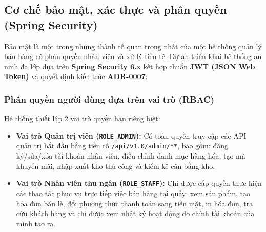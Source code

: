 \subsection{Cơ chế bảo mật, xác thực và phân quyền (Spring Security)}
Bảo mật là một trong những thành tố quan trọng nhất của một hệ thống quản lý bán hàng có phân quyền nhân viên và xử lý tiền tệ. Dự án triển khai hệ thống an ninh đa lớp dựa trên \textbf{Spring Security 6.x} kết hợp chuẩn \textbf{JWT (JSON Web Token)} \cite{rfc7519} và quyết định kiến trúc \textbf{ADR-0007}:

\subsubsection{Phân quyền người dùng dựa trên vai trò (RBAC)}
Hệ thống thiết lập 2 vai trò quyền hạn riêng biệt:
\begin{itemize}[leftmargin=1.5cm]
    \item \textbf{Vai trò Quản trị viên (\texttt{ROLE\_ADMIN}):} Có toàn quyền truy cập các API quản trị bắt đầu bằng tiền tố \texttt{/api/v1.0/admin/**}, bao gồm: đăng ký/sửa/xóa tài khoản nhân viên, điều chỉnh danh mục hàng hóa, tạo mã khuyến mãi, nhập xuất kho thủ công và kiểm kê cân bằng kho.
    \item \textbf{Vai trò Nhân viên thu ngân (\texttt{ROLE\_STAFF}):} Chỉ được cấp quyền thực hiện các thao tác phục vụ trực tiếp việc bán hàng tại quầy: xem sản phẩm, tạo hóa đơn bán lẻ, đổi phương thức thanh toán sang tiền mặt, in hóa đơn, tra cứu khách hàng và chỉ được xem nhật ký hoạt động do chính tài khoản của mình tạo ra.
\end{itemize}

